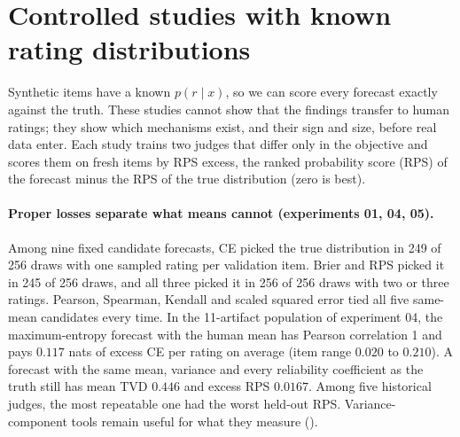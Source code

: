 \section{Controlled studies with known rating distributions}
\label{sec:controlled}

Synthetic items have a known $p(r\mid x)$, so we can score every forecast exactly against the truth.
These studies cannot show that the findings transfer to human ratings; they show which mechanisms exist, and their sign and size, before real data enter.
Each study trains two judges that differ only in the objective and scores them on fresh items by RPS excess, the ranked probability score (RPS) of the forecast minus the RPS of the true distribution (zero is best).

\paragraph{Proper losses separate what means cannot (experiments 01, 04, 05).}
Among nine fixed candidate forecasts, CE picked the true distribution in 249 of 256 draws with one sampled rating per validation item.
Brier and RPS picked it in 245 of 256 draws, and all three picked it in 256 of 256 draws with two or three ratings.
Pearson, Spearman, Kendall and scaled squared error tied all five same-mean candidates every time.
In the 11-artifact population of experiment 04, the maximum-entropy forecast with the human mean has Pearson correlation 1 and pays $0.117$ nats of excess CE per rating on average (item range $0.020$ to $0.210$).
A forecast with the same mean, variance and every reliability coefficient as the truth still has mean TVD $0.446$ and excess RPS $0.0167$.
Among five historical judges, the most repeatable one had the worst held-out RPS.
Variance-component tools remain useful for what they measure ().

